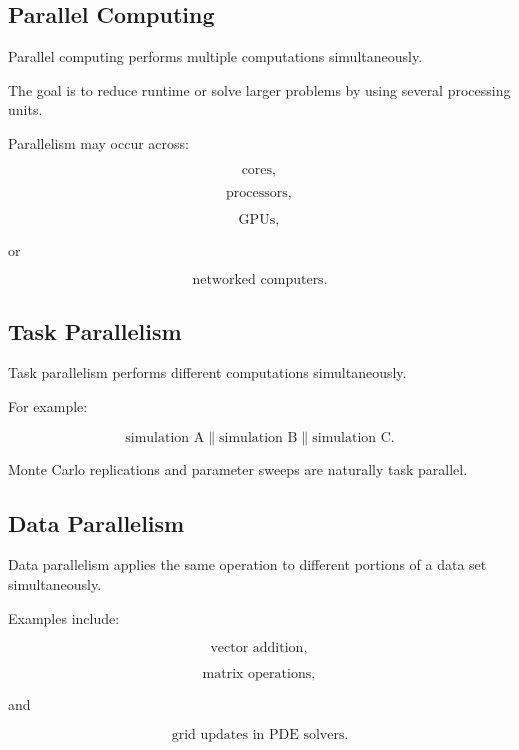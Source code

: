 \subsection{Parallel Computing}
\label{subsec:parallel-computing}

Parallel computing performs multiple computations simultaneously.

The goal is to reduce runtime or solve larger problems by using several
processing units.

Parallelism may occur across:

\[
\boxed{
\text{cores},
}
\]

\[
\boxed{
\text{processors},
}
\]

\[
\boxed{
\text{GPUs},
}
\]

or

\[
\boxed{
\text{networked computers}.
}
\]

\subsection{Task Parallelism}
\label{subsec:task-parallelism}

Task parallelism performs different computations simultaneously.

For example:

\[
\boxed{
\text{simulation A}
\parallel
\text{simulation B}
\parallel
\text{simulation C}.
}
\]

Monte Carlo replications and parameter sweeps are naturally task
parallel.

\subsection{Data Parallelism}
\label{subsec:data-parallelism}

Data parallelism applies the same operation to different portions of a
data set simultaneously.

Examples include:

\[
\boxed{
\text{vector addition},
}
\]

\[
\boxed{
\text{matrix operations},
}
\]

and

\[
\boxed{
\text{grid updates in PDE solvers}.
}
\]

